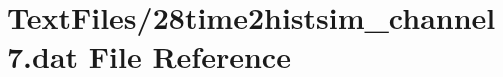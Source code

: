 \hypertarget{28time2histsim__channel7_8dat}{}\section{Text\+Files/28time2histsim\+\_\+channel7.dat File Reference}
\label{28time2histsim__channel7_8dat}
